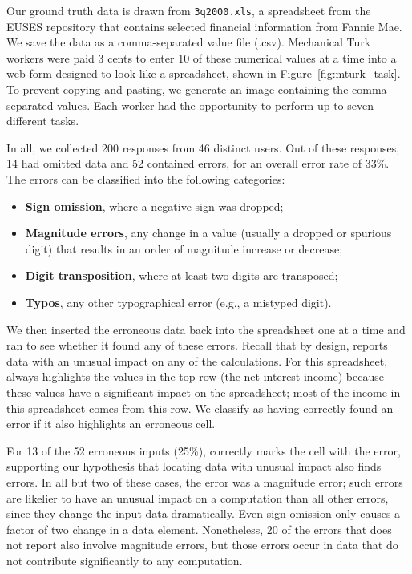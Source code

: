 Our ground truth data is drawn from \texttt{3q2000.xls}, a
spreadsheet from the EUSES repository that contains selected financial
information from Fannie Mae. We save the data as a comma-separated
value file (.csv). Mechanical Turk workers were paid 3 cents to
enter 10 of these numerical values at a time into a web form designed to look
like a spreadsheet, shown in Figure~\ref{fig:mturk_task}. To prevent
copying and pasting, we generate an image containing the
comma-separated values. Each worker had the opportunity to perform up
to seven different tasks.

In all, we collected 200 responses from 46 distinct users. Out of
these responses, 14 had omitted data and 52 contained errors, for an
overall error rate of 33\%. The errors can be classified into the following categories:

\begin{itemize}
\item \textbf{Sign omission}, where a negative sign was dropped;
\item \textbf{Magnitude errors}, any change in a value (usually a dropped or spurious digit) that results in an order of magnitude increase or decrease;
\item \textbf{Digit transposition}, where at least two digits are transposed;
\item \textbf{Typos}, any other typographical error (e.g., a mistyped digit).
\end{itemize}

We then inserted the erroneous data back into the spreadsheet one at a
time and ran \checkcell{} to see whether it found any of these
errors. Recall that by design, \checkcell{} reports data with an
unusual impact on any of the calculations. For this
spreadsheet, \checkcell{} always highlights the values in the top row
(the net interest income) because these values have a significant
impact on the spreadsheet; most of the income in this spreadsheet
comes from this row. We classify \checkcell{} as having correctly
found an error if it also highlights an erroneous cell.

For 13 of the 52 erroneous inputs (25\%), \checkcell{} correctly marks
the cell with the error, supporting our hypothesis that locating data
with unusual impact also finds errors. In all but two of these cases,
the error was a magnitude error; such errors are likelier to have an
unusual impact on a computation than all other errors, since they
change the input data dramatically. Even sign omission only causes a
factor of two change in a data element. Nonetheless, 20 of the errors
that \checkcell{} does not report also involve magnitude errors, but
those errors occur in data that do not contribute significantly to any
computation.


